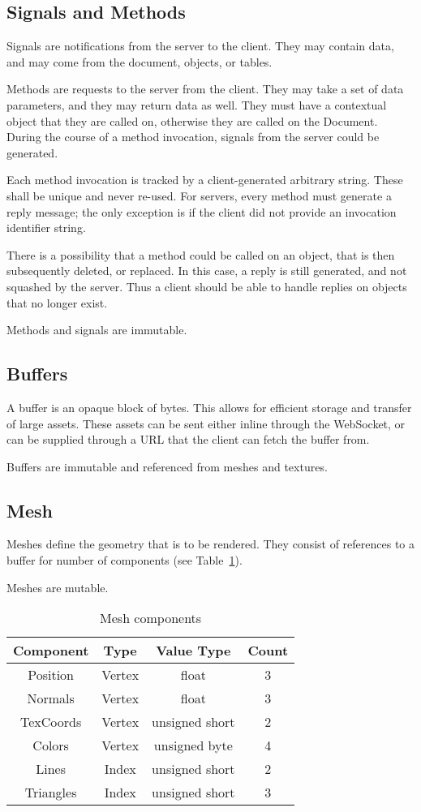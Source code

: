 \documentclass[11pt, oneside]{amsart}
\begin{document}
\subsection{Signals and Methods}
Signals are notifications from the server to the client. They may contain data, and may come from the document, objects, or tables.

Methods are requests to the server from the client. They may take a set of data parameters, and they may return data as well. They must have a contextual object that they are called on, otherwise they are called on the Document. During the course of a method invocation, signals from the server could be generated. 

Each method invocation is tracked by a client-generated arbitrary string. These shall be unique and never re-used. For servers, every method must generate a reply message; the only exception is if the client did not provide an invocation identifier string.

There is a possibility that a method could be called on an object, that is then subsequently deleted, or replaced. In this case, a reply is still generated, and not squashed by the server. Thus a client should be able to handle replies on objects that no longer exist.

Methods and signals are immutable.

\subsection{Buffers}
A buffer is an opaque block of bytes. This allows for efficient storage and transfer of large assets. These assets can be sent either inline through the WebSocket, or can be supplied through a URL that the client can fetch the buffer from.

Buffers are immutable and referenced from meshes and textures.

\subsection{Mesh}
Meshes define the geometry that is to be rendered. They consist of references to a buffer for number of components (see Table~\ref{tab:mesh_comp}).

Meshes are mutable.

\begin{table}
	\begin{tabular}{cccc}
		\toprule
		\textbf{Component} & \textbf{Type} & \textbf{Value Type} & \textbf{Count} \\
		\midrule
		Position & Vertex & float & 3 \\
		Normals & Vertex & float & 3 \\
		TexCoords & Vertex & unsigned short & 2 \\
		Colors & Vertex & unsigned byte & 4 \\
		Lines & Index & unsigned short & 2 \\
		Triangles & Index & unsigned short & 3 \\
		\bottomrule
	\end{tabular}	
	\caption{Mesh components}
	\label{tab:mesh_comp}
\end{table}
\end{document}
